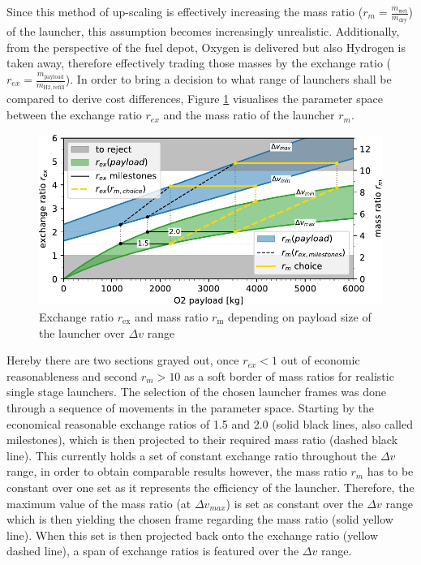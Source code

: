 \documentclass[utf8]{FrontiersinHarvard} %
\begin{document}
Since this method of up-scaling is effectively increasing the mass ratio ($r_m = \frac{m_{\mathrm{wet}}}{m_{\mathrm{dry}}}$) of the launcher, this assumption becomes increasingly unrealistic.
Additionally, from the perspective of the fuel depot, Oxygen is delivered but also Hydrogen is taken away, therefore effectively trading those masses by the exchange ratio ($r_{ex} = \frac{m_{\mathrm{payload}}}{m_{\mathrm{H2,refill}}}$).
In order to bring a decision to what range of launchers shall be compared to derive cost differences, Figure \ref{fig:upscale_ratios} visualises the parameter space between the exchange ratio $r_{ex}$ and the mass ratio of the launcher $r_{m}$.

\begin{figure}[h!]
\begin{center}
\includegraphics[width=\linewidth]{img/upscale_ratios.pdf}
\end{center}
\caption{Exchange ratio $r_{\mathrm{ex}}$ and mass ratio $r_{\mathrm{m}}$ depending on payload size of the launcher over $\Delta v$ range}
\label{fig:upscale_ratios}
\end{figure}

Hereby there are two sections grayed out, once $r_{ex}<1$ out of economic reasonableness and second $r_{m}>10$ as a soft border of mass ratios for realistic single stage launchers.
The selection of the chosen launcher frames was done through a sequence of movements in the parameter space.
Starting by the economical reasonable exchange ratios of 1.5 and 2.0 (solid black lines, also called milestones), which is then projected to their required mass ratio (dashed black line). This currently holds a set of constant exchange ratio throughout the $\Delta v$ range, in order to obtain comparable results however, the mass ratio $r_m$ has to be constant over one set as it represents the efficiency of the launcher.
Therefore, the maximum value of the mass ratio (at $\Delta v_{max}$) is set as constant over the $\Delta v$ range which is then yielding the chosen frame regarding the mass ratio (solid yellow line).
When this set is then projected back onto the exchange ratio (yellow dashed line), a span of exchange ratios is featured over the $\Delta v$ range.
\end{document}
